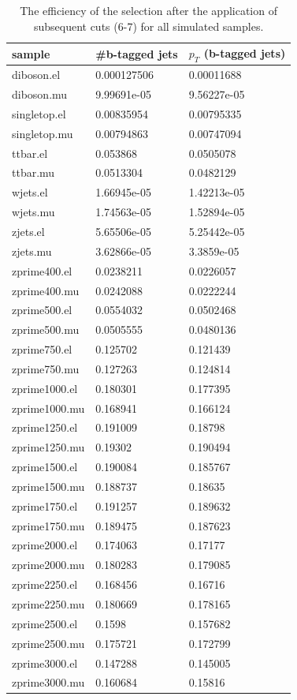 \begin{table}[H]
  \centering
  \caption{The efficiency of the selection after the application of subsequent cuts (6-7) for all simulated samples.}
  \begin{tabular}{l|ll}
      sample           & \#b-tagged jets  & $p_T$ (b-tagged jets) \\
      \hline
      diboson.el    & 0.000127506 & 0.00011688  \\
      diboson.mu    & 9.99691e-05 & 9.56227e-05 \\
      singletop.el  & 0.00835954  & 0.00795335  \\
      singletop.mu  & 0.00794863  & 0.00747094  \\
      ttbar.el      & 0.053868    & 0.0505078   \\
      ttbar.mu      & 0.0513304   & 0.0482129   \\
      wjets.el      & 1.66945e-05 & 1.42213e-05 \\
      wjets.mu      & 1.74563e-05 & 1.52894e-05 \\
      zjets.el      & 5.65506e-05 & 5.25442e-05 \\
      zjets.mu      & 3.62866e-05 & 3.3859e-05  \\
      zprime400.el  & 0.0238211   & 0.0226057   \\
      zprime400.mu  & 0.0242088   & 0.0222244   \\
      zprime500.el  & 0.0554032   & 0.0502468   \\
      zprime500.mu  & 0.0505555   & 0.0480136   \\
      zprime750.el  & 0.125702    & 0.121439    \\
      zprime750.mu  & 0.127263    & 0.124814    \\
      zprime1000.el & 0.180301    & 0.177395    \\
      zprime1000.mu & 0.168941    & 0.166124    \\
      zprime1250.el & 0.191009    & 0.18798     \\
      zprime1250.mu & 0.19302     & 0.190494    \\
      zprime1500.el & 0.190084    & 0.185767    \\
      zprime1500.mu & 0.188737    & 0.18635     \\
      zprime1750.el & 0.191257    & 0.189632    \\
      zprime1750.mu & 0.189475    & 0.187623    \\
      zprime2000.el & 0.174063    & 0.17177     \\
      zprime2000.mu & 0.180283    & 0.179085    \\
      zprime2250.el & 0.168456    & 0.16716     \\
      zprime2250.mu & 0.180669    & 0.178165    \\
      zprime2500.el & 0.1598      & 0.157682    \\
      zprime2500.mu & 0.175721    & 0.172799    \\
      zprime3000.el & 0.147288    & 0.145005    \\
      zprime3000.mu & 0.160684    & 0.15816     
      \end{tabular}
\label{tab:eff_b}


\end{table}
